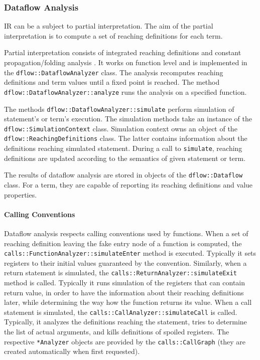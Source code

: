 \documentclass[a4paper,12pt]{article}
\newcommand{\ident}[1]{\texttt{#1}}
\begin{document}
\subsubsection{Dataflow Analysis}

IR can be a subject to partial interpretation.
The aim of the partial interpretation is to compute a set of reaching definitions for each term.

Partial interpretation consists of integrated reaching definitions \cite{reachingDefinition} and constant propagation/folding analysis \cite{constantFolding}.
It works on function level and is implemented in the \ident{dflow::DataflowAnalyzer} class.
The analysis recomputes reaching definitions and term values until a fixed point is reached.
The method \ident{dflow::DataflowAnalyzer::analyze} runs the analysis on a specified function.

The methods \ident{dflow::DataflowAnalyzer::simulate} perform simulation of statement's or term's execution.
The simulation methods take an instance of the \ident{dflow::SimulationContext} class.
Simulation context owns an object of the \ident{dflow::ReachingDefinitions} class.
The latter contains information about the definitions reaching simulated statement.
During a call to \ident{simulate}, reaching definitions are updated according to the semantics of given statement or term.

The results of dataflow analysis are stored in objects of the \ident{dflow::Dataflow} class.
For a term, they are capable of reporting its reaching definitions and value properties.

\paragraph{Calling Conventions}

Dataflow analysis respects calling conventions used by functions.
When a set of reaching definition leaving the fake entry node of a function is computed, the \ident{calls::FunctionAnalyzer::simulateEnter} method is executed.
Typically it sets registers to their initial values guaranteed by the convention.
Similarly, when a return statement is simulated, the \ident{calls::ReturnAnalyzer::simulateExit} method is called.
Typically it runs simulation of the registers that can contain return value, in order to have the information about their reaching definitions later, while determining the way how the function returns its value.
When a call statement is simulated, the \ident{calls::CallAnalyzer::simulateCall} is called.
Typically, it analyzes the definitions reaching the statement, tries to determine the list of actual arguments, and kills definitions of spoiled registers.
The respective \ident{*Analyzer} objects are provided by the \ident{calls::CallGraph} (they are created automatically when first requested).
\end{document}
